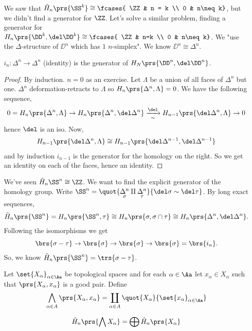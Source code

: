 \documentclass[10pt,a4paper,twoside,openany,hidelinks]{book}
\newcommand{\ra}{\rightarrow}
\begin{document}
We saw that $\tilde{H}_n\prs{\SS^k} \cong \fcases{ \ZZ & n = k \\ 0 & n\neq k}$, but we didn't find a generator for $\ZZ$.
Let's solve a similar problem, finding a generator for $H_n\prs{\DD^k, \del \DD^k} \cong \fcases{ \ZZ & n=k \\ 0 & n\neq k}$.
We "use the $\Delta$-structure of $\DD^n$ which has $1$ $n$-simplex". We know $\DD^n \cong \Delta^n$.
\begin{claim}
$i_n \colon \Delta^n \to \Delta^n$ (identity) is the generator of $H_N\prs{\DD^n, \del \DD^n}$.
\end{claim}
\begin{proof}
By induction. $n=0$ as an exercise.
Let $\Lambda$ be a union of all faces of $\Delta^n$ but one. $\Delta^n$ deformation-retracts to $\Lambda$ so $H_n\prs{\Delta^n, \Lambda} = 0$. We have the following sequence,
\begin{align*}
0 = H_n\prs{\Delta^n, \Lambda} \ra H_n\prs{\Delta^n, \del \Delta^n} \xrightarrow[\sim]{\del} H_{n-1}\prs{\del \Delta^n, \Lambda} \ra 0
\end{align*}
hence $\del$ is an iso.
Now, \[H_{n-1}\prs{\del \Delta^n, \Lambda} \cong H_{n-1} \prs{\del \Delta^{n-1}, \del \Delta^{n-1}}\] and by induction $i_{n-1}$ is the generator for the homology on the right. So we get an identity on each of the faces, hence an identity.
\end{proof}
\begin{example}
We've seen $\tilde{H}_n\SS^n \cong \ZZ$. We want to find the explicit generator of the homology group.
Write $\SS^n = \quot{\underset{\sigma}{\Delta^n} \amalg \underset{\tau}{\Delta^n}}{\del \sigma \sim \del \tau}$.
By long exact sequences, \[\tilde{H}_n\prs{\SS^n} = H_n\prs{\SS^n, \tau} \cong H_n\prs{\sigma, \sigma \cap \tau} \cong H_n\prs{\Delta^n, \del \Delta^n}\text{.}\]
Following the isomorphisms we get \[\brs{\sigma - \tau} \ra \brs{\sigma} \ra \brs{\sigma} \ra \brs{\sigma} = \brs{i_n}\text{.}\]
So, we know $\tilde{H}_n\prs{\SS^n} = \trs{\sigma - \tau}$.
\end{example}
\begin{definition}
Let $\set{X_{\alpha}}_{\alpha \in \Aa}$ be topological spaces and for each $\alpha \in \Aa$ let $x_{\alpha} \in X_{\alpha}$ such that $\prs{X_{\alpha}, x_{\alpha}}$ is a good pair.
Define
\[\bigwedge_{\alpha \in A} \prs{X_{\alpha}, x_{\alpha}} = \coprod_{\alpha \in A} \quot{X_{\alpha}}{\set{x_{\alpha}}_{\alpha \in \Aa}}\]
\end{definition}
\begin{theorem}
\[\tilde{H}_n\prs{\bigwedge X_{\alpha}} = \bigoplus \tilde{H}_n\prs{X_{\alpha}}\]
\end{theorem}
\end{document}
